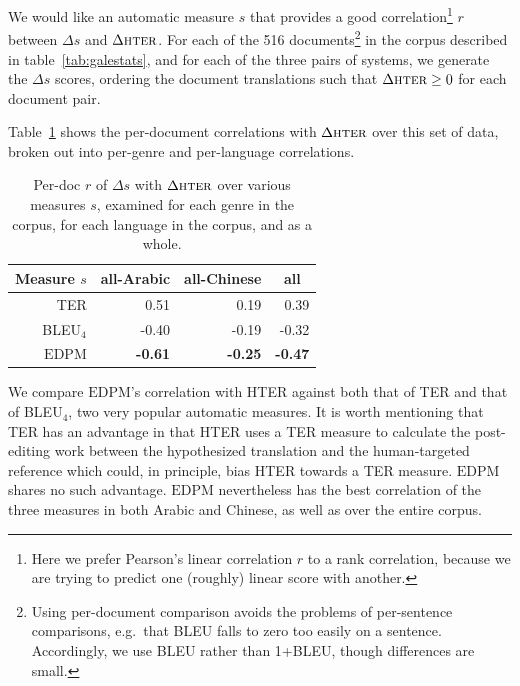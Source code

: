 \documentclass[11pt]{article}
\newcommand{\myEDPM}[0]{\ensuremath{\mathrm{EDPM}}}
\begin{document}
We would like an automatic measure $s$ that provides a good
correlation\footnote{Here we prefer Pearson's linear correlation $r$
  to a rank correlation, because we are trying to predict one
  (roughly) linear score with another.} $r$ between $\Delta s$ and
$\Delta \textsc{hter}$.  For each of the 516 documents\footnote{Using
  per-document comparison avoids the problems of per-sentence
  comparisons, e.g.\ that BLEU falls to zero too easily on a sentence.
  Accordingly, we use BLEU rather than 1+BLEU, though differences
  are small.} in the corpus described in table~\ref{tab:galestats},
and for each of the three pairs of systems, we generate the $\Delta s$
scores, ordering the document translations such that
$\Delta\textsc{hter} \geq 0$ for each document pair.


Table~\ref{tab:hter:perdoc1} shows the per-document correlations with
$\Delta\textsc{hter}$ over this set of data, broken out into per-genre
and per-language correlations.

\begin{table}
  \centering
  \begin{tabular}{r|r|r||r}
     \multicolumn{1}{c|}{Measure $s$} 
     & \multicolumn{1}{c|}{all-Arabic} &
     \multicolumn{1}{c||}{all-Chinese} &\multicolumn{1}{c}{all}\\
    \hline{}
    TER      &  0.51 &  0.19 &  0.39 \\
    BLEU$_4$ & -0.40 & -0.19 & -0.32 \\
    \myEDPM  & 
       \textbf{-0.61}&
               \textbf{-0.25}&
                       \textbf{-0.47}\\
  \end{tabular}
  \caption{Per-doc $r$ of $\Delta s$ with $\Delta\textsc{hter}$ over
    various measures $s$, examined for each genre in the corpus, for each
    language in the corpus, and as a whole. }
  \label{tab:hter:perdoc1}
\end{table}
We compare \myEDPM{}'s correlation with HTER against both that of TER
and that of BLEU$_4$, two very popular automatic measures. It is worth
mentioning that TER has an advantage in that HTER uses a TER measure
to calculate the post-editing work between the hypothesized
translation and the human-targeted reference which could, in
principle, bias HTER towards a TER measure. \myEDPM{} shares no such
advantage.  \myEDPM{} nevertheless has the best correlation of the
three measures in both Arabic and Chinese, as well as over the entire
corpus.
\end{document}
